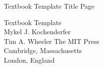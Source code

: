 \begin{titlepage}
{\Huge
\noindent
Textbook Template Title Page}
\end{titlepage}

\cleardoublepage

\thispagestyle{empty}
\vfill
{\Huge
\noindent
Textbook Template
}\\[0.5in]
{\Large
\noindent
Mykel J. Kochenderfer\\
Tim A. Wheeler
}
\vfill
{\large
\noindent
The MIT Press\\
Cambridge, Massachusetts\\
London, England
}\\[1in]

